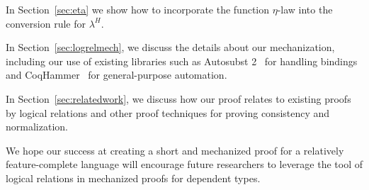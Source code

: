 \documentclass[acmsmall,screen=true,
\ifpublic review=false\else,review=true\fi
  ,anonymous=\ifanonymous true\else false\fi]{acmart}
\newcommand{\lang}{$\lambda^H$\xspace}
\begin{document}
In Section~\ref{sec:eta} we show how to incorporate the function $\eta$-law
into the conversion rule for \lang{}.

In Section~\ref{sec:logrelmech}, we discuss the details about our
mechanization, including our use of existing libraries such as
Autosubst 2~\citep{autosubst2} for handling bindings and
CoqHammer~\citep{czajka2018hammer} for general-purpose automation.

In Section~\ref{sec:relatedwork}, we discuss how our proof relates to
existing proofs by logical relations and other proof techniques for
proving consistency and normalization.

We hope our success at creating a short and mechanized proof for a
relatively feature-complete language will encourage future researchers
to leverage the tool of logical relations in mechanized
proofs for dependent types.












\end{document}
